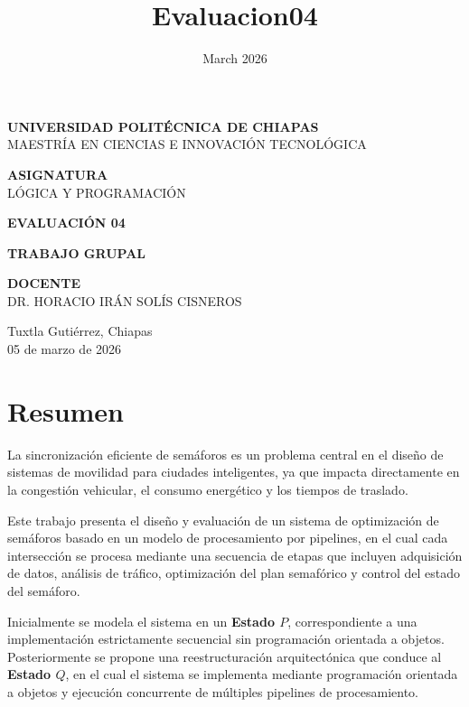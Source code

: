 \documentclass[12pt]{article}
\title{Evaluacion04}
\date{March 2026}
\begin{document}
\begin{titlepage}
\begin{center}

\vspace*{1.5cm}

{\Large \textbf{UNIVERSIDAD POLITÉCNICA DE CHIAPAS}}\\[0.4cm]
{\large MAESTRÍA EN CIENCIAS E INNOVACIÓN TECNOLÓGICA}

\vspace{2cm}

{\large \textbf{ASIGNATURA}}\\[0.2cm]
{\large LÓGICA Y PROGRAMACIÓN}

\vspace{1.8cm}

{\Large \textbf{EVALUACIÓN 04}}

\vspace{1.8cm}

{\large \textbf{TRABAJO GRUPAL}}\\[0.2cm]

\vspace{2cm}

{\large \textbf{DOCENTE}}\\[0.2cm]
{\large DR. HORACIO IRÁN SOLÍS CISNEROS}

\vfill

{\large Tuxtla Gutiérrez, Chiapas\\
05 de marzo de 2026}

\end{center}
\end{titlepage}

\section*{Resumen}

La sincronización eficiente de semáforos es un problema central en el
diseño de sistemas de movilidad para ciudades inteligentes, ya que
impacta directamente en la congestión vehicular, el consumo energético
y los tiempos de traslado.

Este trabajo presenta el diseño y evaluación de un sistema de
optimización de semáforos basado en un modelo de procesamiento por
pipelines, en el cual cada intersección se procesa mediante una
secuencia de etapas que incluyen adquisición de datos, análisis de
tráfico, optimización del plan semafórico y control del estado del
semáforo.

Inicialmente se modela el sistema en un \textbf{Estado \(P\)},
correspondiente a una implementación estrictamente secuencial
sin programación orientada a objetos. Posteriormente se propone una
reestructuración arquitectónica que conduce al \textbf{Estado \(Q\)},
en el cual el sistema se implementa mediante programación orientada
a objetos y ejecución concurrente de múltiples pipelines de
procesamiento.
\end{document}
